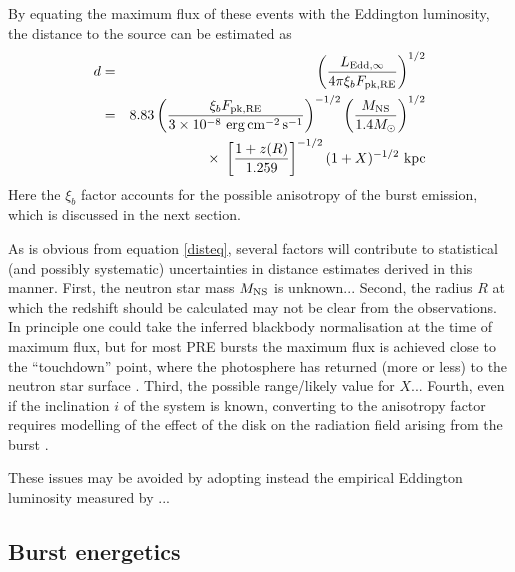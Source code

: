 \documentclass{aastex63}
\newcommand{\epcs}{{\rm erg\,cm^{-2}\,s^{-1}}}
\newcommand{\opz}{1.259}
\begin{document}
By equating the maximum flux of these events with the Eddington luminosity, the distance to the source can be estimated as
\begin{eqnarray}
 d & = & \left(\frac{L_{\rm Edd,\infty}}{4\pi \xi_b F_{\rm pk, RE}}\right)^{1/2} \nonumber \\
   & = & 8.83
	\left( \frac{\xi_b F_{\rm pk, RE}}{3\times10^{-8}\ \epcs} \right)^{-1/2}
       	\left(\frac{M_{\rm NS}}{1.4M_\odot}\right)^{1/2}
\nonumber \\ & & \times\  %
	\left[\frac{1+z(R)}{\opz}\right]^{-1/2}
	(1+X)^{-1/2}\ {\rm kpc}
 \label{disteq}
\end{eqnarray}
% 
Here the $\xi_b$ factor accounts for the possible anisotropy of the burst emission, 
which is discussed in the next section.

As is obvious from equation \ref{disteq}, several factors will contribute to statistical (and possibly systematic) uncertainties in distance estimates derived in this manner. First, the neutron star mass $M_{\rm NS}$ is unknown...
%
Second, the radius $R$ at which the redshift should be calculated may not be clear from the observations. In principle one could take the inferred blackbody normalisation at the time of maximum flux, but for most PRE bursts the maximum flux is achieved close to the ``touchdown'' point, where the photosphere has returned (more or less) to the neutron star surface \cite[e.g.][]{gal06a}.
%
Third, the possible range/likely value for $X$...
%
Fourth, even if the inclination $i$ of the system is known, converting to the anisotropy factor requires modelling of the effect of the disk on the radiation field arising from the burst \cite[e.g.][]{he16}.

These issues may be avoided by adopting instead the empirical Eddington luminosity measured by \cite[]{kuul03a}...

\subsection{Burst energetics}
\label{subsec:energetics}

\label{subsec:energy}
\end{document}
